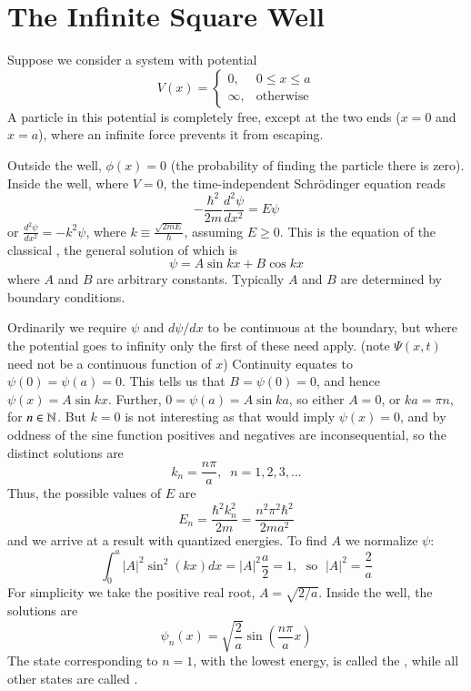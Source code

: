 \documentclass[12pt, a4paper, oneside, openright, titlepage]{book}
\begin{document}
\section{The Infinite Square Well}


Suppose we consider a system with potential $$V(x) = \left\{\begin{array}{lc} 0, & 0 \leq x \leq a \\ \infty, & \text{otherwise} \end{array}\right.$$
A particle in this potential is completely free, except at the two ends ($x = 0$ and $x = a$), where an infinite force prevents it from escaping. 

Outside the well, $\phi(x) = 0$ (the probability of finding the particle there is zero). Inside the well, where $V = 0$, the time-independent Schr\"{o}dinger equation reads $$-\frac{\hbar^2}{2m}\frac{d^2\psi}{dx^2} = E\psi$$
or $\frac{d^2\psi}{dx^2} = -k^2\psi$, where $k \equiv \frac{\sqrt{2mE}}{\hbar}$, assuming $E \geq 0$. This is the equation of the classical , the general solution of which is $$\psi = A\sin kx + B \cos kx$$ where $A$ and $B$ are arbitrary constants. Typically $A$ and $B$ are determined by boundary conditions. 

Ordinarily we require $\psi$ and $d\psi/dx$ to be continuous at the boundary, but where the potential goes to infinity only the first of these need apply. (note $\Psi(x,t)$ need not be a continuous function of $x$) Continuity equates to $\psi(0) = \psi(a) = 0$. This tells us that $B = \psi(0) = 0$, and hence $\psi(x) = A\sin kx$. Further, $0 = \psi(a) = A\sin ka$, so either $A = 0$, or $ka = \pi n$, for $n \in \mathbb N$. But $k = 0$ is not interesting as that would imply $\psi(x) = 0$, and by oddness of the sine function positives and negatives are inconsequential, so the distinct solutions are \begin{equation*}
    k_n = \frac{n\pi}{a}, \;\; n =1,2,3,...
\end{equation*}
Thus, the possible values of $E$ are \begin{equation*}
    \boxed{E_n = \frac{\hbar^2k_n^2}{2m} = \frac{n^2\pi^2\hbar^2}{2ma^2}}
\end{equation*}
and we arrive at a result with quantized energies. To find $A$ we normalize $\psi$: \begin{equation*}
    \int_0^a|A|^2\sin^2(kx)dx = |A|^2\frac{a}{2} = 1,\;\text{ so }\;|A|^2 = \frac{2}{a}
\end{equation*}
For simplicity we take the positive real root, $A = \sqrt{2/a}$. Inside the well, the solutions are \begin{equation*}
    \boxed{\psi_n(x) = \sqrt{\frac{2}{a}}\sin\left(\frac{n\pi}{a}x\right)}
\end{equation*}
The state corresponding to $n = 1$, with the lowest energy, is called the , while all other states are called .
\end{document}
